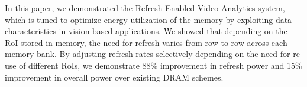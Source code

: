 In this paper, we demonstrated the Refresh Enabled Video Analytics system, which is tuned to optimize energy utilization of the memory by exploiting data characteristics in vision-based applications. We showed that depending on the RoI stored in memory, the need for refresh varies from row to row across each memory bank. By adjusting refresh rates selectively depending on the need for re-use of different RoIs, we demonstrate 88\% improvement in refresh power and 15\% improvement in overall power over existing DRAM schemes.

